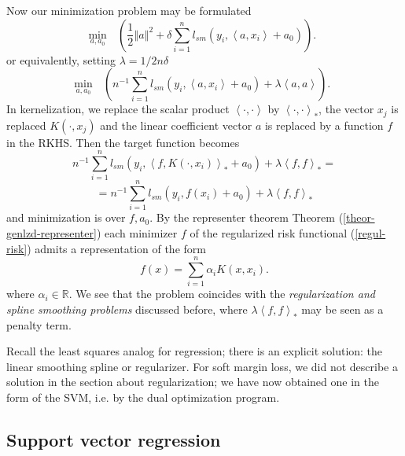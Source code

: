 \documentclass[11pt,twoside]{article}%
\theoremstyle{change}
\begin{document}
Now our minimization problem may be formulated
\[
\min_{a,a_{0}}\text{\ }\left(  \frac{1}{2}\left\Vert a\right\Vert ^{2}%
+\delta\sum_{i=1}^{n}l_{sm}(y_{i},\left\langle a,x_{i}\right\rangle
+a_{0})\right)  .\text{ }%
\]
or equivalently, setting $\lambda=1/2n\delta$%
\[
\min_{a,a_{0}}\text{\ }\left(  n^{-1}\sum_{i=1}^{n}l_{sm}(y_{i},\left\langle
a,x_{i}\right\rangle +a_{0})+\lambda\left\langle a,a\right\rangle \right)
.\text{ }%
\]
In kernelization, we replace the scalar product $\left\langle \cdot
,\cdot\right\rangle $ by $\left\langle \cdot,\cdot\right\rangle _{\ast}$, the
vector $x_{j}$ is replaced $K(\cdot,x_{j})$ and the linear coefficient vector
$a$ is replaced by a function $f$ in the RKHS. Then the target function
becomes
\[
n^{-1}\sum_{i=1}^{n}l_{sm}(y_{i},\left\langle f,K(\cdot,x_{i})\right\rangle
_{\ast}+a_{0})+\lambda\left\langle f,f\right\rangle _{\ast}=
\]%
\begin{equation}
=n^{-1}\sum_{i=1}^{n}l_{sm}(y_{i},f(x_{i})+a_{0})+\lambda\left\langle
f,f\right\rangle _{\ast}\label{minimizing}%
\end{equation}
and minimization is over $f,a_{0}$. By the representer theorem Theorem
(\ref{theor-genlzd-representer}) each minimizer $f$ of the regularized risk
functional (\ref{regul-risk}) admits a representation of the form
\[
f(x)=\sum_{i=1}^{n}\alpha_{i}K\left(  x,x_{i}\right)  .
\]
where $\alpha_{i}\in\mathbb{R}$. We see that the problem coincides with the
\textit{regularization and spline smoothing problems} discussed before, where
$\lambda\left\langle f,f\right\rangle _{\ast}$ may be seen as a penalty term.

Recall the least squares analog for regression; there is an explicit solution:
the linear smoothing spline or regularizer. For soft margin loss, we did not
describe a solution in the section about regularization; we have now obtained
one in the form of the SVM, i.e. by the dual optimization program.

\subsection{Support vector regression}
\end{document}

